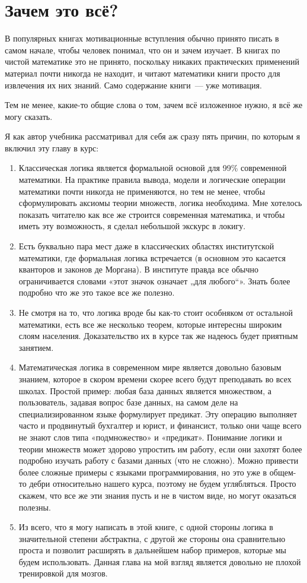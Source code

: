 \section{Зачем это всё?}

В популярных книгах мотивационные вступления обычно принято писать в самом начале, чтобы человек понимал, что он и зачем изучает. В книгах по чистой математике это не принято, поскольку никаких практических применений материал почти никогда не находит, и читают математики книги просто для извлечения их них знаний. Само содержание книги~--- уже мотивация.

Тем не менее, какие-то общие слова о том, зачем всё изложенное нужно, я всё же могу сказать.

Я как автор учебника рассматривал для себя аж сразу пять причин, по которым я включил эту главу в курс:

\begin{enumerate}
\item Классическая логика является формальной основой для 99\% современной математики. На практике правила вывода, модели и логические операции математики почти никогда не применяются, но тем не менее, чтобы сформулировать аксиомы теории множеств, логика необходима. Мне хотелось показать читателю как все же строится современная математика, и чтобы иметь эту возможность, я сделал небольшой экскурс в локигу.
\item Есть буквально пара мест даже в классических областях институтской математики, где формальная логика встречается (в основном это касается кванторов и законов де Моргана). В институте правда все обычно ограничивается словами «этот значок означает „для любого“». Знать более подробно что же это такое все же полезно.
\item Не смотря на то, что логика вроде бы как-то стоит особняком от остальной математики, есть все же несколько теорем, которые интересны широким слоям населения. Доказательство их в курсе так же надеюсь будет приятным занятием.
\item Математическая логика в современном мире является довольно базовым знанием, которое в скором времени скорее всего будут преподавать во всех школах. Простой пример: любая база данных является множеством, а пользователь, задавая вопрос базе данных, на самом деле на специализированном языке формулирует предикат. Эту операцию выполняет часто и продвинутый бухгалтер и юрист, и финансист, только они чаще всего не знают слов типа «подмножество» и «предикат». Понимание логики и теории множеств может здорово упростить им работу, если они захотят более подробно изучать работу с базами данных (что не сложно). Можно привести более сложные примеры с языками программирования, но это уже в общем-то дебри относительно нашего курса, поэтому не будем углябляться. Просто скажем, что все же эти знания пусть и не в чистом виде, но могут оказаться полезны.
\item Из всего, что я могу написать в этой книге, с одной стороны логика в значительной степени абстрактна, с другой же стороны она сравнительно проста и позволит расширять в дальнейшем набор примеров, которые мы будем использовать. Данная глава на мой взгляд является довольно не плохой тренировкой для мозгов.
\end{enumerate}

